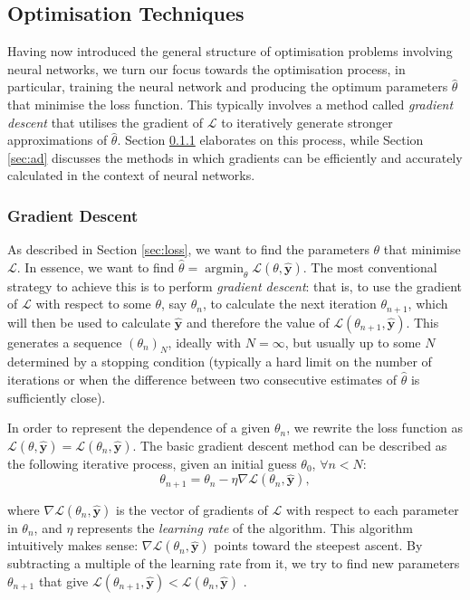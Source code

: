 \documentclass[a4paper,11pt,titlepage]{article}
\DeclareMathOperator*{\argmin}{argmin}
\theoremstyle{definition}
\theoremstyle{plain}
\theoremstyle{remark}
\begin{document}
\subsection{Optimisation Techniques}

Having now introduced the general structure of optimisation problems involving neural networks, we turn our focus towards the optimisation process, in particular, training the neural network and producing the optimum parameters $\hat{\theta}$ that minimise the loss function. This typically involves a method called \textit{gradient descent} that utilises the gradient of $\mathcal{L}$ to iteratively generate stronger approximations of $\hat{\theta}$. Section \ref{sec:gd} elaborates on this process, while Section \ref{sec:ad} discusses the methods in which gradients can be efficiently and accurately calculated in the context of neural networks.

\subsubsection{Gradient Descent}
\label{sec:gd}

As described in Section \ref{sec:loss}, we want to find the parameters $\theta$ that minimise $\mathcal{L}$. In essence, we want to find $\hat{\theta} = \argmin_\theta \mathcal{L}(\theta, \mathbf{\hat{y}}) $. The most conventional strategy to achieve this is to perform \textit{gradient descent}: that is, to use the gradient of $\mathcal{L}$ with respect to some $\theta$, say $\theta_n$, to calculate the next iteration $\theta_{n+1}$, which will then be used to calculate $\mathbf{\hat{y}}$ and therefore the value of $\mathcal{L}(\theta_{n+1}, \mathbf{\hat{y}})$. This generates a sequence $(\theta_n)_N$, ideally with $N = \infty$, but usually up to some $N$ determined by a stopping condition (typically a hard limit on the number of iterations or when the difference between two consecutive estimates of $\hat{\theta}$ is sufficiently close). 

In order to represent the dependence of a given $\theta_n$, we rewrite the loss function as $\mathcal{L}(\theta,\mathbf{\hat{y}}) = \mathcal{L}(\theta_n, \mathbf{\hat{y}})$. The basic gradient descent method can be described as the following iterative process, given an initial guess $\theta_0$, $\forall n < N$:
$$\theta_{n+1} = \theta_n - \eta \nabla\mathcal{L}(\theta_n, \mathbf{\hat{y}}),$$

where $\nabla\mathcal{L}(\theta_n, \mathbf{\hat{y}})$ is the vector of gradients of $\mathcal{L}$ with respect to each parameter in $\theta_n$, and $\eta$ represents the \textit{learning rate} of the algorithm. This algorithm intuitively makes sense: $\nabla\mathcal{L}(\theta_n, \mathbf{\hat{y}})$ points toward the steepest ascent. By subtracting a multiple of the learning rate from it, we try to find new parameters $\theta_{n+1}$ that give $\mathcal{L}(\theta_{n+1}, \mathbf{\hat{y}}) < \mathcal{L}(\theta_{n}, \mathbf{\hat{y}})$ \cite{nazarathy2021}.
\end{document}

